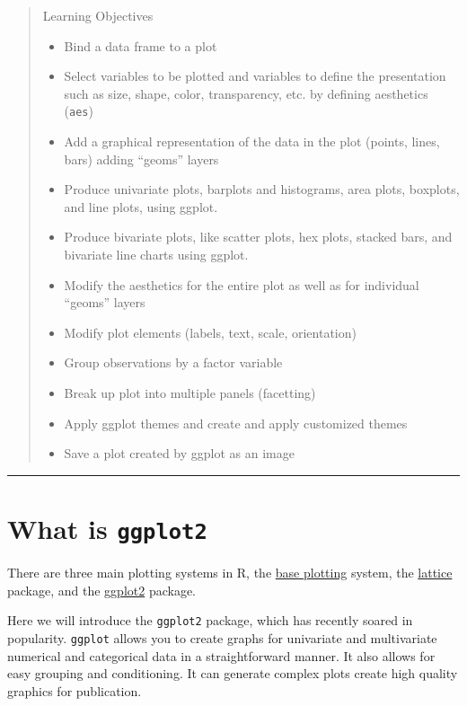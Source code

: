 \documentclass[]{book}
\providecommand{\tightlist}{%
  \setlength{\itemsep}{0pt}\setlength{\parskip}{0pt}}
\begin{document}
\begin{quote}
Learning Objectives

\begin{itemize}
\tightlist
\item
  Bind a data frame to a plot
\item
  Select variables to be plotted and variables to define the presentation such as size, shape, color, transparency, etc. by defining aesthetics (\texttt{aes})
\item
  Add a graphical representation of the data in the plot (points, lines, bars) adding ``geoms'' layers
\item
  Produce univariate plots, barplots and histograms, area plots, boxplots, and line plots, using ggplot.
\item
  Produce bivariate plots, like scatter plots, hex plots, stacked bars, and bivariate line charts using ggplot.
\item
  Modify the aesthetics for the entire plot as well as for individual ``geoms'' layers
\item
  Modify plot elements (labels, text, scale, orientation)
\item
  Group observations by a factor variable
\item
  Break up plot into multiple panels (facetting)
\item
  Apply ggplot themes and create and apply customized themes
\item
  Save a plot created by ggplot as an image
\end{itemize}
\end{quote}

\begin{center}\rule{0.5\linewidth}{\linethickness}\end{center}

\hypertarget{what-is-ggplot2}{%
\section{\texorpdfstring{What is \textbf{\texttt{ggplot2}}}{What is ggplot2}}\label{what-is-ggplot2}}

There are three main plotting systems in R, the \href{https://www.statmethods.net/graphs/index.html}{base plotting} system, the \href{https://www.statmethods.net/advgraphs/trellis.html}{lattice} package, and the \href{https://www.statmethods.net/advgraphs/ggplot2.html}{ggplot2} package.

Here we will introduce the \texttt{ggplot2} package, which has recently soared in popularity. \texttt{ggplot} allows you to create graphs for univariate and multivariate numerical and categorical data in a straightforward manner. It also allows for easy grouping and conditioning. It can generate complex plots create high quality graphics for publication.
\end{document}
